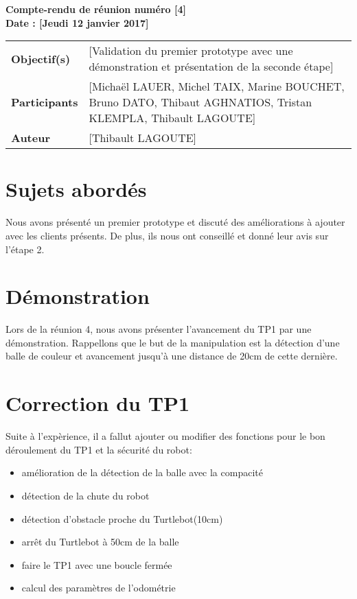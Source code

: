 \documentclass[a4wide,10pt]{article}
\begin{document}
\thispagestyle{empty}

\begin{center}
\LARGE \bfseries  Compte-rendu de réunion numéro [4] \\
\large \bfseries  Date : [Jeudi 12 janvier 2017]

\vspace{0.33cm}
\end{center}

\begin{center}
\begin{tabular}{ p{2.2cm}  p{13.6cm} }
\textbf{Objectif(s)} & [Validation du premier prototype avec une démonstration et présentation de la seconde étape]  \\
\textbf{Participants} & [Michaël LAUER, Michel TAIX, Marine BOUCHET, Bruno DATO, Thibaut AGHNATIOS, Tristan KLEMPLA, Thibault LAGOUTE] \\ 
\textbf{Auteur} & [Thibault LAGOUTE]  \\
\end{tabular}
\end{center}

\section*{Sujets abordés}

Nous avons présenté un premier prototype et discuté des améliorations à ajouter avec les clients présents. De plus, ils nous ont conseillé et donné leur avis sur l'étape 2.


\section*{Démonstration}


Lors de la réunion 4, nous avons présenter l'avancement du TP1 par une démonstration. Rappellons que le but de la manipulation est la détection d'une balle de couleur et avancement jusqu'à une distance de 20cm de cette dernière. \\  
	

\section*{Correction du TP1}

Suite à l'expèrience, il a fallut ajouter ou modifier des fonctions pour le bon déroulement du TP1 et la sécurité du robot:

\begin{itemize}
\item amélioration de la détection de la balle avec la compacité
\item détection de la chute du robot
\item détection d'obstacle proche du Turtlebot(10cm)
\item arrêt du Turtlebot à 50cm de la balle
\item faire le TP1 avec une boucle fermée 
\item calcul des paramètres de l'odométrie
\end{itemize}
\end{document}
